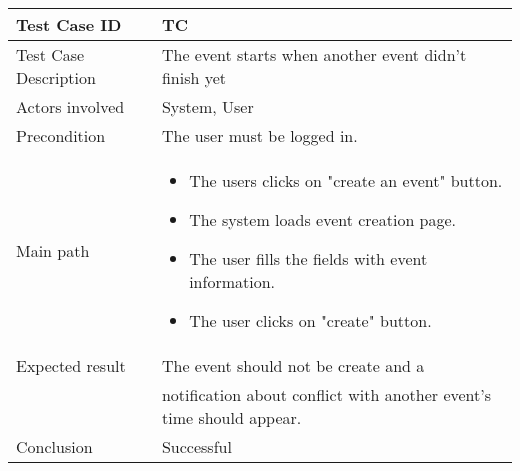 \begin{center} \begin{tabular}{|l|l|}
  \hline
  Test Case ID & TC \z\\
  \hline
  Test Case Description & The event starts when another event didn't finish yet \\
  \hline
  Actors involved & System, User\\
   \hline
  Precondition & The user must be logged in.\\
  \hline
  Main path &   \begin{minipage}{5in}
    \vskip 4pt
            \begin{itemize}
              \item The users clicks on "create an event" button.
              \item The system loads event creation page.
              \item The user fills the fields with event information.
              \item The user clicks on "create" button.
            \end{itemize}
    \vskip 4pt
  \end{minipage}  \\
  \hline
  Expected result & The event should not be create and a\\
  & notification about conflict with another event's time should appear.\\
  \hline
  Conclusion & Successful\\
  \hline
\end{tabular} \end{center}


